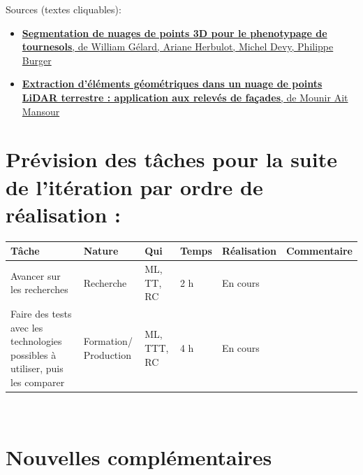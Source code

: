 \documentclass[12pt,titlepage,french]{article}
\begin{document}
Sources (textes cliquables): 
\begin{itemize}
\item \href{https://orasis2017.sciencesconf.org/135580/document}{\textbf{Segmentation de nuages de points 3D pour le phenotypage de tournesols}, de William Gélard, Ariane Herbulot, Michel Devy, Philippe Burger}
\item \href{https://dumas.ccsd.cnrs.fr/dumas-01164570/document?fbclid=IwAR078AKyDp0CPfwM0DWix35VVFcN1GtHBQ92EN-wLI7GQrexncCMDqfIoHQ}{\textbf{Extraction d’éléments géométriques dans un nuage de points LiDAR terrestre : application aux relevés de façades}, de Mounir Ait Mansour}
\end{itemize}



\section{Prévision des tâches pour la suite de l'itération par ordre de réalisation :}

\noindent\begin{tabularx}{17cm}{|p{2.5cm}|p{2.5cm}|p{1cm}|p{1.5cm}|p{2.5cm}|X|}
    \hline
    \textbf{Tâche} & \textbf{Nature} & \textbf{Qui} & \textbf{Temps} & \textbf{Réalisation} & \textbf{Commentaire} \\
    \hline
    Avancer sur les recherches & Recherche & ML, TT, RC & 2 h & En cours & \\
    \hline
    Faire des tests avec les technologies possibles à utiliser, puis les comparer & Formation/ Production & ML, TTT, RC & 4 h & En cours &  \\
    \hline
\end{tabularx} \\

\section{Nouvelles complémentaires}
\end{document}
